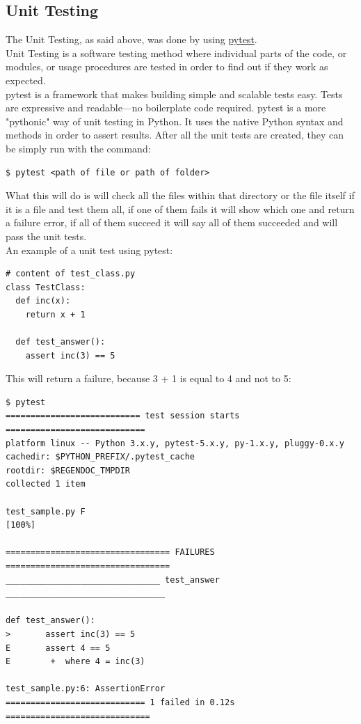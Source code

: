 \subsection{Unit Testing}
The Unit Testing, as said above, was done by using \href{https://docs.pytest.org/en/latest/}{pytest}.\\
Unit Testing is a software testing method where individual parts of the code, or modules, or usage procedures are tested in order to find out if they work as expected.\\
pytest is a framework that makes building simple and scalable tests easy. Tests are expressive and readable—no boilerplate code required. \cite{WhatIsPytest}	
pytest is a more "pythonic" way of unit testing in Python. It uses the native Python syntax and methods in order to assert results. After all the unit tests are created, they can be simply run with the command:
\begin{verbatim}
$ pytest <path of file or path of folder>
\end{verbatim}
What this will do is will check all the files within that directory or the file itself if it is a file and test them all, if one of them fails it will show which one and return a failure error, if all of them succeed it will say all of them succeeded and will pass the unit tests.\\
\newline
An example of a unit test using pytest:
\begin{verbatim}
# content of test_class.py
class TestClass:
  def inc(x):
    return x + 1

  def test_answer():
    assert inc(3) == 5
\end{verbatim}
\newpage
This will return a failure, because 3 + 1  is equal to 4 and not to 5:
\begin{verbatim}
$ pytest
=========================== test session starts ============================
platform linux -- Python 3.x.y, pytest-5.x.y, py-1.x.y, pluggy-0.x.y
cachedir: $PYTHON_PREFIX/.pytest_cache
rootdir: $REGENDOC_TMPDIR
collected 1 item

test_sample.py F                                                     [100%]

================================= FAILURES =================================
_______________________________ test_answer ________________________________

def test_answer():
>       assert inc(3) == 5
E       assert 4 == 5
E        +  where 4 = inc(3)

test_sample.py:6: AssertionError
============================ 1 failed in 0.12s =============================
\end{verbatim}

